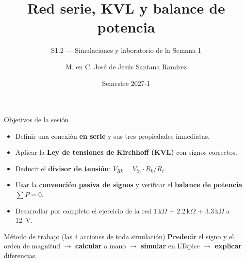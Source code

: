 \documentclass[aspectratio=169]{beamer}
\title[S1.2 · Serie y balance]{Red serie, KVL y balance de potencia}
\subtitle{S1.2 — Simulaciones y laboratorio de la Semana 1}
\institute{Licenciatura en Ingeniería Aeroespacial\\ UNAM · ENES Unidad Juriquilla}
\author{M. en C. José de Jesús Santana Ramírez}
\date{Semestre 2027-1}
\begin{document}
\begin{frame}[plain]
  \titlepage
\end{frame}

\begin{frame}{Objetivos de la sesión}
  \begin{itemize}
    \item Definir una conexión \textbf{en serie} y sus tres propiedades inmediatas.
    \item Aplicar la \textbf{Ley de tensiones de Kirchhoff (KVL)} con signos correctos.
    \item Deducir el \textbf{divisor de tensión}: $V_{Rk} = V_{in}\cdot R_k/R_t$.
    \item Usar la \textbf{convención pasiva de signos} y verificar el \textbf{balance de potencia} $\sum P = 0$.
    \item Desarrollar por completo el ejercicio de la red $1\,\text{k}\Omega$ + $2.2\,\text{k}\Omega$ + $3.3\,\text{k}\Omega$ a \SI{12}{\volt}.
  \end{itemize}
  \pause
  \begin{block}{Método de trabajo (las 4 acciones de toda simulación)}
    \textbf{Predecir} el signo y el orden de magnitud $\rightarrow$ \textbf{calcular} a mano $\rightarrow$ \textbf{simular} en LTspice $\rightarrow$ \textbf{explicar} diferencias.
  \end{block}
\end{frame}
\end{document}
